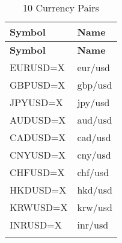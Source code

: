 \begin{longtable}{|l|l|}
\hline
\textbf{Symbol} & \textbf{Name}  \\
\endfirsthead

\hline
\textbf{Symbol} & \textbf{Name} \\
\endhead

\endfoot

\hline
EURUSD=X & \acrfull{eur}/\acrshort{usd} \\ \hline
GBPUSD=X & \acrfull{gbp}/\acrshort{usd} \\ \hline
JPYUSD=X & \acrfull{jpy}/\acrshort{usd} \\ \hline
AUDUSD=X & \acrfull{aud}/\acrshort{usd} \\ \hline
CADUSD=X & \acrfull{cad}/\acrshort{usd} \\ \hline
CNYUSD=X & \acrfull{cny}/\acrshort{usd} \\ \hline
CHFUSD=X & \acrfull{chf}/\acrshort{usd} \\ \hline
HKDUSD=X & \acrfull{hkd}/\acrshort{usd} \\ \hline
KRWUSD=X & \acrfull{krw}/\acrshort{usd} \\ \hline
INRUSD=X & \acrfull{inr}/\acrshort{usd} \\ \hline
\caption{10 Currency Pairs}
\label{tab:currencies}
\end{longtable}
